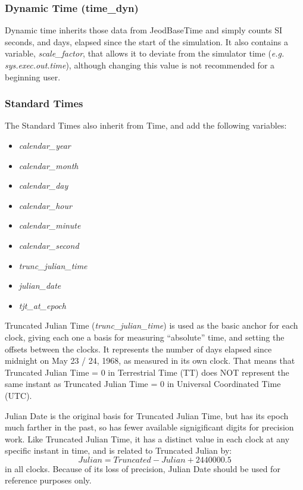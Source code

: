 \subsubsection[Dynamic Time (time\_dyn)]{Dynamic Time (time\_dyn)}
Dynamic time inherits those data from JeodBaseTime and simply counts SI seconds,
and days, elapsed since the start of the simulation.  It also contains
a variable, \textit{scale\_factor}, that allows it to deviate from the
simulator time (\textit{e.g. sys.exec.out.time}), although changing
this value is not recommended for a beginning user.

\subsubsection[Standard Times]{Standard Times}
The Standard Times also inherit from Time, and add the following
variables:


\begin{itemize}
\item {\itshape
calendar\_year}
\item {\itshape
calendar\_month}
\item {\itshape
calendar\_day}
\item {\itshape
calendar\_hour}
\item {\itshape
calendar\_minute}
\item {\itshape
calendar\_second}
\item {\itshape
trunc\_julian\_time}
\item {\itshape
julian\_date}
\item {\itshape
tjt\_at\_epoch}
\end{itemize}



Truncated Julian Time (\textit{trunc\_julian\_time}) is used as the basic anchor
for each clock, giving each one a basis for measuring ``absolute'' time, and
setting the offsets between the clocks.  It
represents the number of days elapsed since
midnight on May 23 / 24, 1968, as measured in its own clock.
That means that Truncated
Julian Time = 0 in Terrestrial Time (TT) does NOT represent the same
instant as Truncated Julian Time = 0 in Universal Coordinated Time
(UTC).

Julian Date is the original basis for Truncated Julian Time, but has its epoch
much farther in the past, so has fewer available signigificant digits for
precision work.  Like
Truncated Julian Time, it has a distinct value in each clock at any specific
instant in time, and is related to Truncated Julian by:
\begin{equation*}
Julian = Truncated-Julian + 2440000.5
\end{equation*}
in all clocks.
Because of its loss of precision, Julian Date should be used for reference
purposes only.


